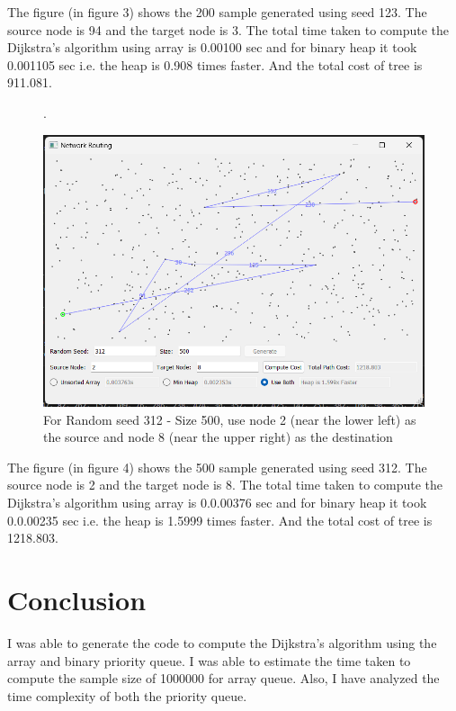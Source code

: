 \documentclass[12pt]{article}
\begin{document}
\noindent The figure (in figure 3) shows the 200 sample generated using seed 123. The source node is 94 and the target node is 3. The total time taken to compute the Dijkstra’s algorithm using array is 0.00100 sec and for binary heap it took 0.001105 sec i.e. the heap is 0.908 times faster. And the total cost of tree is 911.081.

\newpage

\begin{figure}[h]. %
    \begin{center}
      \includegraphics[width=0.80\linewidth]{figures/28.png} 
      \caption{For Random seed 312 - Size 500, use node 2 (near the lower left) as the source and node 8 (near the upper right) as the destination}\label{fig:28}
    \end{center}
  \end{figure}

\noindent The figure (in figure 4) shows the 500 sample generated using seed 312. The source node is 2 and the target node is 8. The total time taken to compute the Dijkstra’s algorithm using array is 0.0.00376 sec and for binary heap it took 0.0.00235 sec i.e. the heap is 1.5999 times faster. And the total cost of tree is 1218.803.

\newpage

\section{Conclusion}
I was able to generate the code to compute the Dijkstra’s algorithm using the array and binary priority queue. I was able to estimate the time taken to compute the sample size of 1000000 for array queue. Also, I have analyzed the time complexity of both the priority queue. 
\end{document}
